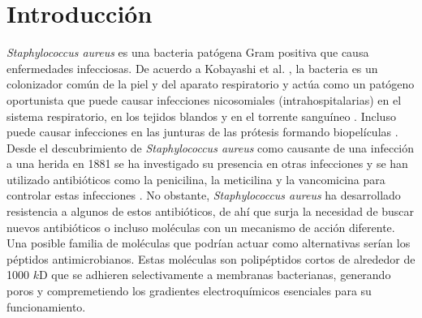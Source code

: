 \chapter{Introducci\'{o}n}
\textit{Staphylococcus aureus} es una bacteria pat\'{o}gena Gram positiva que causa enfermedades infecciosas. De acuerdo a Kobayashi et al. \cite{Kobayashi2015PathogenesisAbscesses}, la bacteria es un colonizador com\'{u}n de la piel y del aparato respiratorio y act\'{u}a como un pat\'{o}geno oportunista que puede causar infecciones nicosomiales (intrahospitalarias) en el sistema respiratorio, en los tejidos blandos y en el torrente sangu\'ineo \cite{HarpavatS.NissimS.LipppincottsMicrocards:MicrobiologyFlashCards2012.}. Incluso puede causar infecciones en las junturas de las pr\'otesis formando biopel\'iculas \cite{Meylan2018}.\\



Desde el descubrimiento de \textit{Staphylococcus aureus} como causante de una infecci\'on a una herida en 1881 \cite{Orent2006AMagazine} se ha investigado su presencia en otras infecciones y se han utilizado antibi\'oticos como la penicilina, la meticilina y la vancomicina para controlar estas infecciones   \cite{HarpavatS.NissimS.LipppincottsMicrocards:MicrobiologyFlashCards2012.}. No obstante, \textit{Staphylococcus aureus} ha desarrollado resistencia a algunos de estos antibi\'oticos,  de ah\'{i} que surja la necesidad de buscar nuevos antibi\'oticos o incluso mol\'{e}culas con un mecanismo de acci\'{o}n diferente. Una posible familia de mol\'{e}culas que podr\'{i}an actuar como alternativas ser\'{i}an los p\'{e}ptidos antimicrobianos. Estas mol\'{e}culas son polip\'{e}ptidos cortos de alrededor de 1000 $k$D que se adhieren selectivamente a membranas bacterianas, generando poros y compremetiendo los gradientes electroqu\'{i}micos esenciales para su funcionamiento. \\

